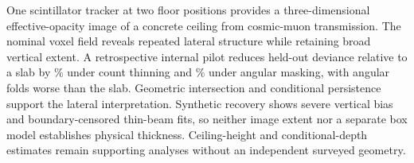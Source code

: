 One scintillator tracker at two floor positions provides a three-dimensional effective-opacity image of a concrete ceiling from cosmic-muon transmission. The nominal voxel field reveals repeated lateral structure while retaining broad vertical extent. A retrospective internal pilot reduces held-out deviance relative to a slab by \InternalCountImprovementPercent\% under count thinning and \InternalAngularImprovementPercent\% under angular masking, with \InternalAngularWorseFolds{} angular folds worse than the slab. Geometric intersection and conditional persistence support the lateral interpretation. Synthetic recovery shows severe vertical bias and boundary-censored thin-beam fits, so neither image extent nor a separate box model establishes physical thickness. Ceiling-height and conditional-depth estimates remain supporting analyses without an independent surveyed geometry.
